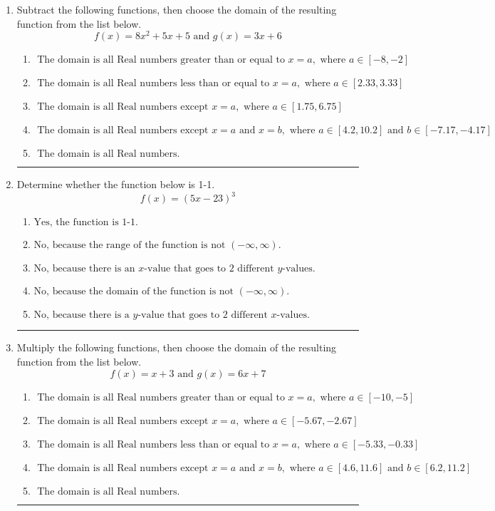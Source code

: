 \documentclass[14pt]{extbook}
\newcommand{\litem}[1]{\item#1\hspace*{-1cm}\rule{\textwidth}{0.4pt}}
\begin{document}
\begin{enumerate}
{\begin{enumerate}[label=\Alph*.]
\end{enumerate} }
\litem{
Subtract the following functions, then choose the domain of the resulting function from the list below.\[ f(x) = 8x^{2} +5 x + 5 \text{ and } g(x) = 3x + 6 \]\begin{enumerate}[label=\Alph*.]
\item \( \text{ The domain is all Real numbers greater than or equal to } x = a, \text{ where } a \in [-8, -2] \)
\item \( \text{ The domain is all Real numbers less than or equal to } x = a, \text{ where } a \in [2.33, 3.33] \)
\item \( \text{ The domain is all Real numbers except } x = a, \text{ where } a \in [1.75, 6.75] \)
\item \( \text{ The domain is all Real numbers except } x = a \text{ and } x = b, \text{ where } a \in [4.2, 10.2] \text{ and } b \in [-7.17, -4.17] \)
\item \( \text{ The domain is all Real numbers. } \)

\end{enumerate} }
\litem{
Determine whether the function below is 1-1.\[ f(x) = (5 x - 23)^3 \]\begin{enumerate}[label=\Alph*.]
\item \( \text{Yes, the function is 1-1.} \)
\item \( \text{No, because the range of the function is not $(-\infty, \infty)$.} \)
\item \( \text{No, because there is an $x$-value that goes to 2 different $y$-values.} \)
\item \( \text{No, because the domain of the function is not $(-\infty, \infty)$.} \)
\item \( \text{No, because there is a $y$-value that goes to 2 different $x$-values.} \)

\end{enumerate} }
\litem{
Multiply the following functions, then choose the domain of the resulting function from the list below.\[ f(x) = x + 3 \text{ and } g(x) = 6x + 7 \]\begin{enumerate}[label=\Alph*.]
\item \( \text{ The domain is all Real numbers greater than or equal to } x = a, \text{ where } a \in [-10, -5] \)
\item \( \text{ The domain is all Real numbers except } x = a, \text{ where } a \in [-5.67, -2.67] \)
\item \( \text{ The domain is all Real numbers less than or equal to } x = a, \text{ where } a \in [-5.33, -0.33] \)
\item \( \text{ The domain is all Real numbers except } x = a \text{ and } x = b, \text{ where } a \in [4.6, 11.6] \text{ and } b \in [6.2, 11.2] \)
\item \( \text{ The domain is all Real numbers. } \)

\end{enumerate} }
\end{enumerate}
\end{document}
